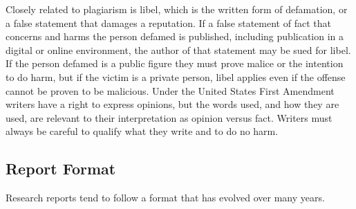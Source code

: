 Closely related to plagiarism is libel, which is the written form of defamation, or a false statement that damages a reputation. If a false statement of fact that concerns and harms the person defamed is published, including publication in a digital or online environment, the author of that statement may be sued for libel. If the person defamed is a public figure they must prove malice or the intention to do harm, but if the victim is a private person, libel applies even if the offense cannot be proven to be malicious. Under the United States First Amendment writers have a right to express opinions, but the words used, and how they are used, are relevant to their interpretation as opinion versus fact. Writers must always be careful to qualify what they write and to do no harm.

\subsection{Report Format}

Research reports tend to follow a format that has evolved over many years.

